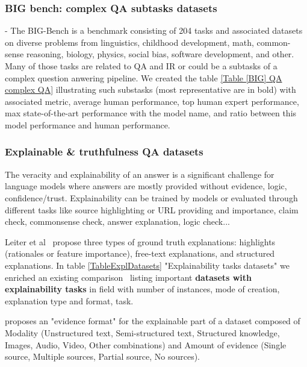 \documentclass[acmsmall]{acmart}
\begin{document}
\label{sec_BIG_Bench_datasets}
\subsubsection{BIG bench: complex QA subtasks datasets} - The BIG-Bench is a benchmark consisting of 204 tasks and associated datasets on diverse problems from linguistics, childhood development, math, common-sense reasoning, biology, physics, social bias, software development, and other. Many of those tasks are related to QA and IR or could be a subtasks of a complex question anwering pipeline. We created the table \ref{Table [BIG] QA complex QA} illustrating such substasks (most representative are in bold) with associated metric, average human performance, top human expert performance, max state-of-the-art performance with the model name, and ratio between this model performance and human performance.

\subsubsection{Explainable \& truthfulness QA datasets}
The veracity and explainability of an answer is a significant challenge for language models where answers are mostly provided without evidence, logic, confidence/trust. Explainability can be trained by models or evaluated through different tasks like source highlighting or URL providing and importance, claim check, commonsense check, answer explanation, logic check...\newline

Leiter et al~\citep{leiterExplainableEvaluationMetrics2022} propose three types of ground truth explanations: highlights (rationales or feature importance), free-text explanations, and structured explanations. In table \ref{TableExplDatasets} "Explainability tasks datasets" we enriched an existing comparison~\citep{wiegreffeTeachMeExplain2021} listing important \textbf{datasets with explainability tasks} in field with number of instances, mode of creation, explanation type and format, task.

\citet{rogersQADatasetExplosion2022} proposes an "evidence format" for the explainable part of a dataset composed of Modality (Unstructured text, Semi-structured text, Structured knowledge, Images, Audio, Video, Other combinations) and Amount of evidence (Single source, Multiple sources, Partial source, No sources).
\end{document}
